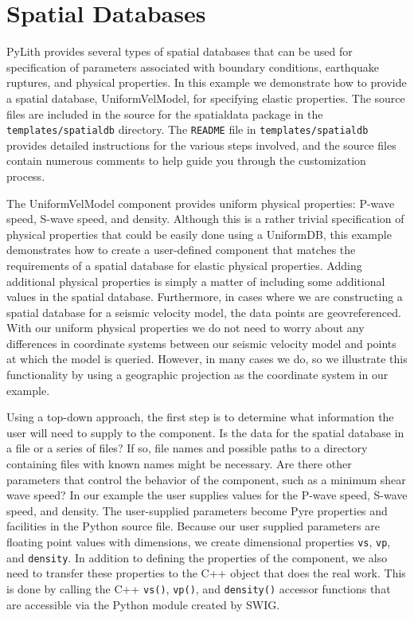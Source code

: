 \section{\label{sec:Extending:SpatialDatabases}Spatial Databases}

PyLith provides several types of spatial databases that can be used
for specification of parameters associated with boundary conditions,
earthquake ruptures, and physical properties. In this example we demonstrate
how to provide a spatial database, UniformVelModel, for specifying
elastic properties. The source files are included in the source for
the spatialdata package in the \texttt{templates/spatialdb} directory.
The \texttt{README} file in \texttt{templates/spatialdb} provides
detailed instructions for the various steps involved, and the source
files contain numerous comments to help guide you through the customization
process. 

The UniformVelModel component provides uniform physical properties:
P-wave speed, S-wave speed, and density. Although this is a rather
trivial specification of physical properties that could be easily
done using a UniformDB, this example demonstrates how to create a
user-defined component that matches the requirements of a spatial
database for elastic physical properties. Adding additional physical
properties is simply a matter of including some additional values
in the spatial database. Furthermore, in cases where we are constructing
a spatial database for a seismic velocity model, the data points are
geovreferenced. With our uniform physical properties we do not need
to worry about any differences in coordinate systems between our seismic
velocity model and points at which the model is queried. However,
in many cases we do, so we illustrate this functionality by using
a geographic projection as the coordinate system in our example.

Using a top-down approach, the first step is to determine what information
the user will need to supply to the component. Is the data for the
spatial database in a file or a series of files? If so, file names
and possible paths to a directory containing files with known names
might be necessary. Are there other parameters that control the behavior
of the component, such as a minimum shear wave speed? In our example
the user supplies values for the P-wave speed, S-wave speed, and density.
The user-supplied parameters become Pyre properties and facilities
in the Python source file. Because our user supplied parameters are
floating point values with dimensions, we create dimensional properties
\texttt{vs}, \texttt{vp}, and \texttt{density}. In addition to defining
the properties of the component, we also need to transfer these properties
to the C++ object that does the real work. This is done by calling
the C++ \texttt{vs()}, \texttt{vp()}, and \texttt{density()} accessor
functions that are accessible via the Python module created by SWIG.

